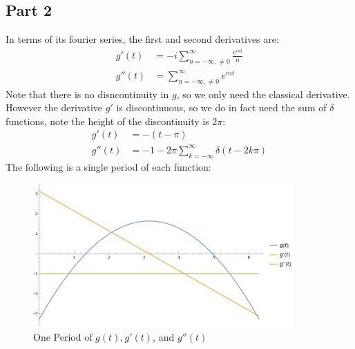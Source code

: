 \documentclass[12pt]{article}
\begin{document}
\subsection*{Part 2}
In terms of its fourier series, the first and second derivatives are:
\begin{equation}
  \boxed{
    \begin{aligned}
      g'(t)&=-i\sum_{n=-\infty,\neq0}^\infty\frac{e^{int}}{n}\\
      g''(t)&=\sum_{n=-\infty,\neq0}^\infty e^{int}
    \end{aligned}
  }
\end{equation}
Note that there is no disncontinuity in $g$, so we only need the classical derivative. However the derivative $g'$ is discontinuous, so we do in fact need the sum of $\delta$ functions, note the height of the discontinuity is $2\pi$:
\begin{equation}
  \boxed{
    \begin{aligned}
      g'(t)&=-(t-\pi)\\
      g''(t)&=-1-2\pi\sum_{k=-\infty}^\infty\delta(t-2k\pi)
    \end{aligned}
  }
\end{equation}
The following is a single period of each function:
\begin{figure}[H]
  \centering
  \includegraphics[width=10cm]{fourierplot.png}
  \caption{One Period of $g(t), g'(t)$, and $g''(t)$}
  \label{fig:1}
\end{figure}
\end{document}
